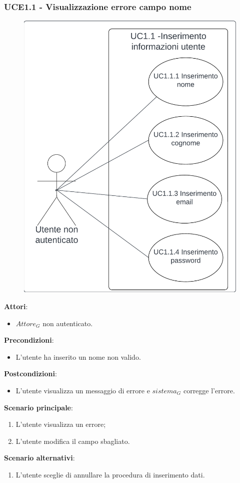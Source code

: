 \subsubsection{UCE1.1 - Visualizzazione errore campo nome}
\begin{figure}[H]
    \centering
    \includegraphics[width=0.75\linewidth]{ucd/UCD1.1.png}
\end{figure}
\textbf{Attori}:
\begin{itemize}
    \item $\textit{Attore}_G$ non autenticato.
\end{itemize}
\textbf{Precondizioni}:
\begin{itemize}
    \item L'utente ha inserito un nome non valido.
\end{itemize}
\textbf{Postcondizioni}:
\begin{itemize}
    \item L'utente visualizza un messaggio di errore e $\textit{sistema}_G$ corregge l'errore.
\end{itemize}
\textbf{Scenario principale}:
\begin{enumerate}
    \item L'utente visualizza un errore;
    \item L'utente modifica il campo sbagliato.
\end{enumerate}
\textbf{Scenario alternativi}:
\begin{enumerate}
    \item L'utente sceglie di annullare la procedura di inserimento dati.
\end{enumerate}